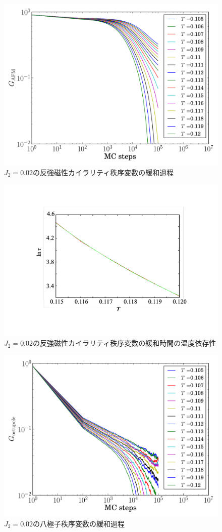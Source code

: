 \documentclass[12pt,titlepage,dvipdfmx]{jarticle}
\begin{document}
\begin{figure}[H]
   \centering
   \includegraphics[width=12cm]{figure/afvc_raw_data_j2_0.02.pdf}
   \caption{$J_2=0.02$の反強磁性カイラリティ秩序変数の緩和過程}
\end{figure}

\begin{figure}[H]
   \centering
   \includegraphics[width=12cm]{figure/afvc_Tc_j2_0.02.pdf}
   \caption{$J_2=0.02$の反強磁性カイラリティ秩序変数の緩和時間の温度依存性}
\end{figure}

\begin{figure}[H]
   \centering
   \includegraphics[width=12cm]{figure/octupole_raw_data_j2_0.02.pdf}
   \caption{$J_2=0.02$の八極子秩序変数の緩和過程}
\end{figure}
\end{document}
